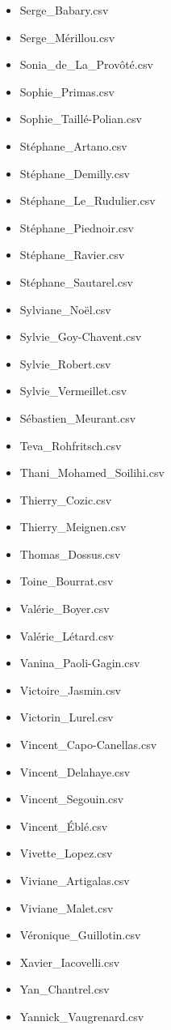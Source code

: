 \documentclass[a4paper,12pt,twoside]{book}
\begin{document}
\begin{itemize}
  \item Serge\_Babary.csv
  \item Serge\_Mérillou.csv
  \item Sonia\_de\_La\_Provôté.csv
  \item Sophie\_Primas.csv
  \item Sophie\_Taillé-Polian.csv
  \item Stéphane\_Artano.csv
  \item Stéphane\_Demilly.csv
  \item Stéphane\_Le\_Rudulier.csv
  \item Stéphane\_Piednoir.csv
  \item Stéphane\_Ravier.csv
  \item Stéphane\_Sautarel.csv
  \item Sylviane\_Noël.csv
  \item Sylvie\_Goy-Chavent.csv
  \item Sylvie\_Robert.csv
  \item Sylvie\_Vermeillet.csv
  \item Sébastien\_Meurant.csv
  \item Teva\_Rohfritsch.csv
  \item Thani\_Mohamed\_Soilihi.csv
  \item Thierry\_Cozic.csv
  \item Thierry\_Meignen.csv
  \item Thomas\_Dossus.csv
  \item Toine\_Bourrat.csv
  \item Valérie\_Boyer.csv
  \item Valérie\_Létard.csv
  \item Vanina\_Paoli-Gagin.csv
  \item Victoire\_Jasmin.csv
  \item Victorin\_Lurel.csv
  \item Vincent\_Capo-Canellas.csv
  \item Vincent\_Delahaye.csv
  \item Vincent\_Segouin.csv
  \item Vincent\_Éblé.csv
  \item Vivette\_Lopez.csv
  \item Viviane\_Artigalas.csv
  \item Viviane\_Malet.csv
  \item Véronique\_Guillotin.csv
  \item Xavier\_Iacovelli.csv
  \item Yan\_Chantrel.csv
  \item Yannick\_Vaugrenard.csv

\end{itemize}
\end{document}
